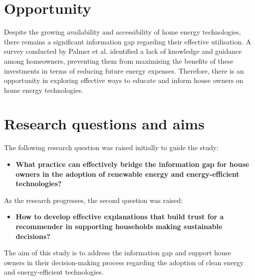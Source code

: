 \section{Opportunity}

Despite the growing availability and accessibility of home energy technologies, there remains a significant information gap regarding their effective utilisation. 
A survey conducted by Palmer et al. \cite{informationgap} identified a lack of knowledge and guidance among homeowners, preventing them from maximising the benefits of these investments in terms of reducing future energy expenses. 
Therefore, there is an opportunity in exploring effective ways to educate and inform house owners on home energy technologies. 


\section{Research questions and aims}

The following research question was raised initially to guide the study: 
\begin{itemize}
  \item \textbf{What practice can effectively bridge the information gap for house owners in the adoption of renewable energy and energy-efficient technologies?}
\end{itemize}

As the research progresses, the second question was raised: 
\begin{itemize}
  \item \textbf{How to develop effective explanations that build trust for a recommender in supporting households making sustainable decisions? }
\end{itemize}

The aim of this study is to address the information gap and support house owners in their decision-making process regarding the adoption of clean energy and energy-efficient technologies. 

